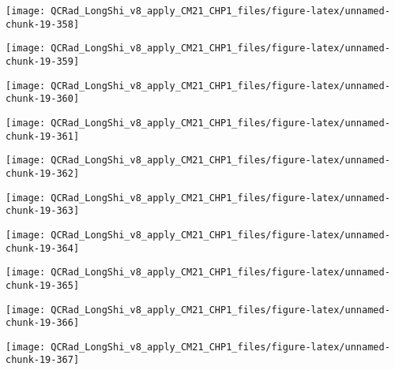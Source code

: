 \documentclass[
  10pt,
  a4paper,oneside]{article}
\begin{document}
\begin{center}\texttt{[image: QCRad\_LongShi\_v8\_apply\_CM21\_CHP1\_files/figure-latex/unnamed-chunk-19-358]} \end{center}

\begin{center}\texttt{[image: QCRad\_LongShi\_v8\_apply\_CM21\_CHP1\_files/figure-latex/unnamed-chunk-19-359]} \end{center}

\begin{center}\texttt{[image: QCRad\_LongShi\_v8\_apply\_CM21\_CHP1\_files/figure-latex/unnamed-chunk-19-360]} \end{center}

\begin{center}\texttt{[image: QCRad\_LongShi\_v8\_apply\_CM21\_CHP1\_files/figure-latex/unnamed-chunk-19-361]} \end{center}

\begin{center}\texttt{[image: QCRad\_LongShi\_v8\_apply\_CM21\_CHP1\_files/figure-latex/unnamed-chunk-19-362]} \end{center}

\begin{center}\texttt{[image: QCRad\_LongShi\_v8\_apply\_CM21\_CHP1\_files/figure-latex/unnamed-chunk-19-363]} \end{center}

\begin{center}\texttt{[image: QCRad\_LongShi\_v8\_apply\_CM21\_CHP1\_files/figure-latex/unnamed-chunk-19-364]} \end{center}

\begin{center}\texttt{[image: QCRad\_LongShi\_v8\_apply\_CM21\_CHP1\_files/figure-latex/unnamed-chunk-19-365]} \end{center}

\begin{center}\texttt{[image: QCRad\_LongShi\_v8\_apply\_CM21\_CHP1\_files/figure-latex/unnamed-chunk-19-366]} \end{center}

\begin{center}\texttt{[image: QCRad\_LongShi\_v8\_apply\_CM21\_CHP1\_files/figure-latex/unnamed-chunk-19-367]} \end{center}
\end{document}
